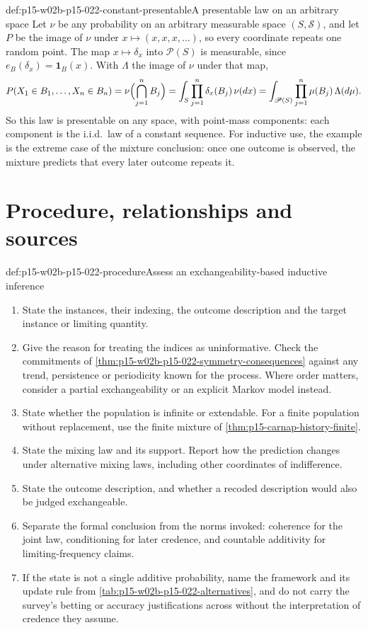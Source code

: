 \begin{hbexample}{def:p15-w02b-p15-022-constant-presentable}{A presentable law on an arbitrary space}
Let \(\nu\) be any probability on an arbitrary measurable space
\((S,\mathcal S)\), and let \(P\) be the image of \(\nu\) under
\(x\mapsto(x,x,x,\ldots)\), so every coordinate repeats one random point.
The map \(x\mapsto\delta_x\) into \(\mathscr P(S)\) is measurable, since
\(e_B(\delta_x)=\mathbf1_B(x)\). With \(\Lambda\) the image of \(\nu\)
under that map,
\[
 P(X_1\in B_1,\ldots,X_n\in B_n)=\nu\Bigl(\bigcap_{j=1}^nB_j\Bigr)
     =\int_S\prod_{j=1}^n\delta_x(B_j)\,\nu(dx)
     =\int_{\mathscr P(S)}\prod_{j=1}^n\mu(B_j)\,\Lambda(d\mu).
\]
So this law is presentable on any space, with point-mass components: each
component is the i.i.d.\ law of a constant sequence. For inductive use,
the example is the extreme case of the mixture conclusion: once one
outcome is observed, the mixture predicts that every later outcome
repeats it.
\end{hbexample}

\section{Procedure, relationships and sources}
\label{sec:p15-w02b-p15-022-procedure}

\begin{hbmethod}{def:p15-w02b-p15-022-procedure}{Assess an exchangeability-based inductive inference}
\begin{enumerate}
\item State the instances, their indexing, the outcome description and the
      target instance or limiting quantity.
\item Give the reason for treating the indices as uninformative. Check the
      commitments of \cref{thm:p15-w02b-p15-022-symmetry-consequences}
      against any trend, persistence or periodicity known for the process.
      Where order matters, consider a partial exchangeability or an explicit
      Markov model instead.
\item State whether the population is infinite or extendable. For a finite
      population without replacement, use the finite mixture of
      \cref{thm:p15-carnap-history-finite}.
\item State the mixing law and its support. Report how the prediction
      changes under alternative mixing laws, including other coordinates of
      indifference.
\item State the outcome description, and whether a recoded description
      would also be judged exchangeable.
\item Separate the formal conclusion from the norms invoked: coherence for
      the joint law, conditioning for later credence, and countable
      additivity for limiting-frequency claims.
\item If the state is not a single additive probability, name the
      framework and its update rule from
      \cref{tab:p15-w02b-p15-022-alternatives}, and do not carry the
      survey's betting or accuracy justifications across without the
      interpretation of credence they assume.
\end{enumerate}
\end{hbmethod}

